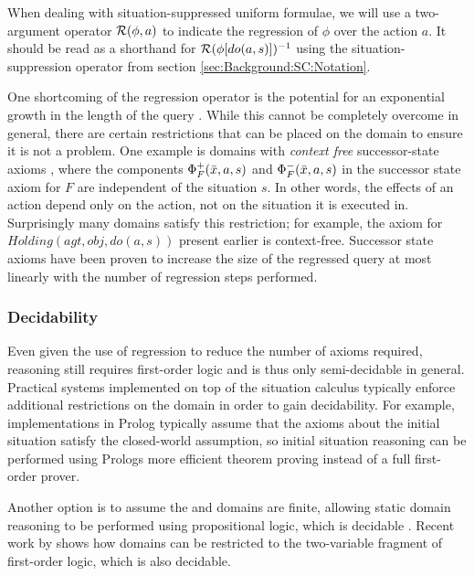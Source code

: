 When dealing with situation-suppressed uniform formulae, we will use
a two-argument operator $\mathcal{R}(\phi,a)$ to indicate the regression
of $\phi$ over the action $a$. It should be read as a shorthand
for $\mathcal{R}(\phi[do(a,s)])^{-1}$ using the situation-suppression operator
from section \ref{sec:Background:SC:Notation}.

One shortcoming of the regression operator is the potential for an
exponential growth in the length of the query \citep{reiter91frameprob}.
While this cannot be completely overcome in general, there are certain
restrictions that can be placed on the domain to ensure it is not
a problem. One example is domains with \emph{context free} successor-state
axioms \citep{reiter01kia}, where the components $\Phi_{F}^{+}(\bar{x},a,s)$
and $\Phi_{F}^{-}(\bar{x},a,s)$ in the successor state axiom for
$F$ are independent of the situation $s$. In other words, the effects
of an action depend only on the action, not on the situation it is
executed in. Surprisingly many domains satisfy this restriction; for
example, the axiom for $Holding(agt,obj,do(a,s))$ present earlier
is context-free. Successor state axioms have been proven to increase
the size of the regressed query at most linearly with the number of
regression steps performed.


\subsubsection{Decidability}

Even given the use of regression to reduce the number of axioms required,
reasoning still requires first-order logic and is thus only semi-decidable
in general. Practical systems implemented on top of the situation
calculus typically enforce additional restrictions on the domain in
order to gain decidability. For example, implementations in Prolog
typically assume that the axioms about the initial situation satisfy
the closed-world assumption, so initial situation reasoning can be
performed using Prologs more efficient theorem proving instead of
a full first-order prover.

Another option is to assume the  and  domains
are finite, allowing static domain reasoning to be performed using
propositional logic, which is decidable \citep{giacomo99impl_robots,levesque04krr_book}.
Recent work by \citet{yu07twovar_sitcalc} shows how domains can be
restricted to the two-variable fragment of first-order logic, which
is also decidable.


